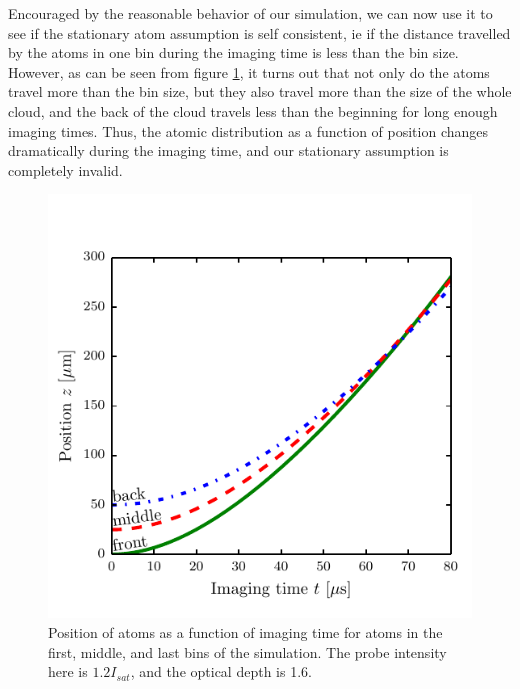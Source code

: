 \documentclass[12pt]{iopart}
\begin{document}
\par Encouraged by the reasonable behavior of our simulation, we can now use it to see if the stationary atom assumption is self consistent, ie if the distance travelled by the atoms in one bin during the imaging time is less than the bin size. However, as can be seen from figure \ref{fig:atomTravel}, it turns out that not only do the atoms travel more than the bin size, but they also travel more than the size of the whole cloud, and the back of the cloud travels less than the beginning for long enough imaging times. Thus, the atomic distribution as a function of position changes dramatically during the imaging time, and our stationary assumption is completely invalid. 
\begin{figure}
	\includegraphics[scale=0.57]{figure4}
\caption{Position of atoms as a function of imaging time for atoms in the first, middle, and last bins of the simulation. The probe intensity here is $1.2 I_{sat}$, and the optical depth is 1.6.}  
\label{fig:atomTravel}
\end{figure}
\end{document}
